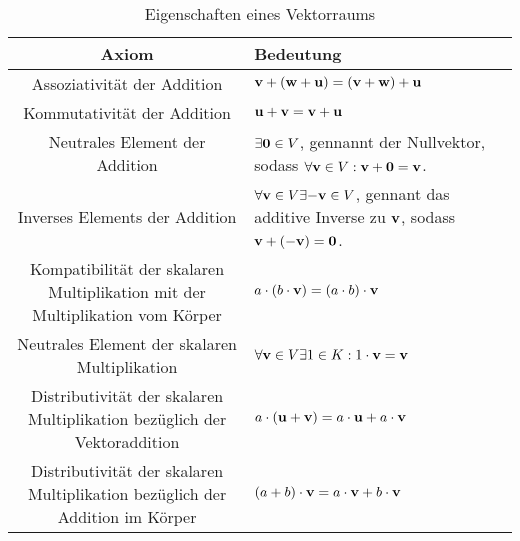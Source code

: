 \begin{definition}[Vektorräume]
\begin{table}[!ht]
\begin{tabularx}{\textwidth}{C X}
				\toprule
				\textbf{Axiom}                                                          & \textbf{Bedeutung}                                                                                                                                     \\ \midrule
				Assoziativität der Addition                                               & $\mathbf{v}+(\mathbf{w}+\mathbf{u}) = (\mathbf{v} + \mathbf{w}) + \mathbf{u}$                                                                                                \\
				Kommutativität der Addition                                               & $\mathbf{u} + \mathbf{v} = \mathbf{v} + \mathbf{u}$                                                                                                                  \\
				Neutrales Element der Addition                                            & $\exists\mathbf{0} \in V$, gennannt der Nullvektor, sodass $\forall\mathbf{v} \in V: \mathbf{v} + \mathbf{0} = \mathbf{v}$.                         \\
				Inverses Elements der Addition                                            & $\forall\mathbf{v} \in V\exists \mathbf{-v} \in V$, gennant das additive Inverse zu $\mathbf{v}$, sodass $\mathbf{v} + (\mathbf{-v}) = \mathbf{0}$. \\
				Kompatibilität der skalaren Multiplikation mit der Multiplikation vom Körper        & $a\cdot(b\cdot\mathbf{v}) = (a\cdot b)\cdot\mathbf{v}$                                                                                                      \\
				Neutrales Element der skalaren Multiplikation                               & $\forall \mathbf{v} \in V \exists 1\in K: 1 \cdot \mathbf{v} = \mathbf{v}$                           \\
				Distributivität der skalaren Multiplikation bezüglich der Vektoraddition & $a\cdot(\mathbf{u} + \mathbf{v}) = a\cdot\mathbf{u} + a\cdot\mathbf{v}$                                                                                              \\
				Distributivität der skalaren Multiplikation bezüglich der Addition im Körper  & $(a + b)\cdot\mathbf{v} = a\cdot\mathbf{v} + b\cdot\mathbf{v}$                                                                                                   \\ \bottomrule
			\end{tabularx}
			\caption{Eigenschaften eines Vektorraums}
		\end{table}
\end{definition}